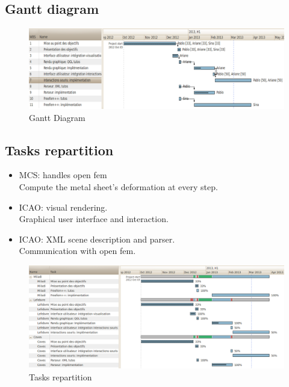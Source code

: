 \documentclass{beamer}
\begin{document}
\subsection{Gantt diagram}
\begin{frame}
    \begin{figure}
        \includegraphics[width=\textwidth]{img/gantt.png}
        \caption{Gantt Diagram}
        \label{DiagrammeDeGant}
    \end{figure}
\end{frame}
\subsection{Tasks repartition}
\begin{frame}
    \begin{itemize}
        \item MCS: handles open fem\\
            Compute the metal sheet's deformation at every step.
        \item ICAO: visual rendering.\\
            Graphical user interface and interaction.
        \item ICAO: XML scene description and parser.\\
            Communication with open fem.
    \end{itemize}
\end{frame}
\begin{frame}
    \begin{figure}
        \includegraphics[width=\textwidth]{img/ganttRepartition.png}
        \caption{Tasks repartition}
        \label{Répartition}
    \end{figure}
\end{frame}
\end{document}
